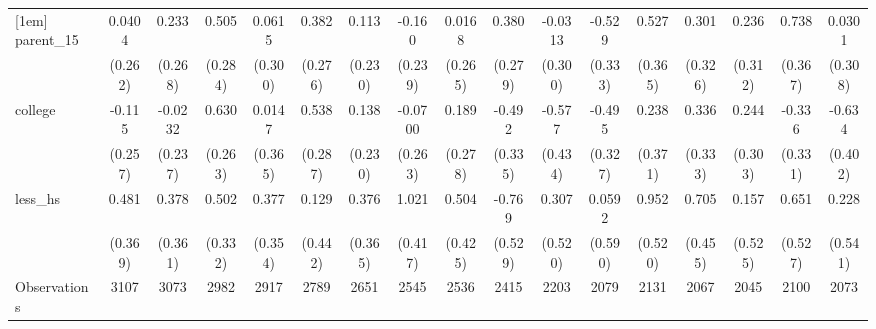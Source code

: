{\begin{tabular}{l*{16}{c}}
[1em]
parent\_15           &      0.0404         &       0.233         &       0.505         &      0.0615         &       0.382         &       0.113         &      -0.160         &      0.0168         &       0.380         &     -0.0313         &      -0.529         &       0.527         &       0.301         &       0.236         &       0.738\sym{*}  &      0.0301         \\
                    &     (0.262)         &     (0.268)         &     (0.284)         &     (0.300)         &     (0.276)         &     (0.230)         &     (0.239)         &     (0.265)         &     (0.279)         &     (0.300)         &     (0.333)         &     (0.365)         &     (0.326)         &     (0.312)         &     (0.367)         &     (0.308)         \\
[1em]
college             &      -0.115         &     -0.0232         &       0.630\sym{*}  &      0.0147         &       0.538         &       0.138         &     -0.0700         &       0.189         &      -0.492         &      -0.577         &      -0.495         &       0.238         &       0.336         &       0.244         &      -0.336         &      -0.634         \\
                    &     (0.257)         &     (0.237)         &     (0.263)         &     (0.365)         &     (0.287)         &     (0.230)         &     (0.263)         &     (0.278)         &     (0.335)         &     (0.434)         &     (0.327)         &     (0.371)         &     (0.333)         &     (0.303)         &     (0.331)         &     (0.402)         \\
[1em]
less\_hs             &       0.481         &       0.378         &       0.502         &       0.377         &       0.129         &       0.376         &       1.021\sym{*}  &       0.504         &      -0.769         &       0.307         &      0.0592         &       0.952         &       0.705         &       0.157         &       0.651         &       0.228         \\
                    &     (0.369)         &     (0.361)         &     (0.332)         &     (0.354)         &     (0.442)         &     (0.365)         &     (0.417)         &     (0.425)         &     (0.529)         &     (0.520)         &     (0.590)         &     (0.520)         &     (0.455)         &     (0.525)         &     (0.527)         &     (0.541)         \\
\hline
Observations        &        3107         &        3073         &        2982         &        2917         &        2789         &        2651         &        2545         &        2536         &        2415         &        2203         &        2079         &        2131         &        2067         &        2045         &        2100         &        2073         \\

\end{tabular}}
